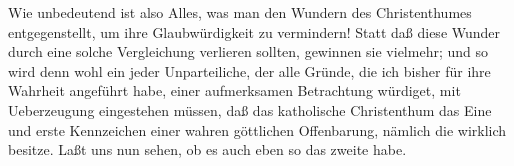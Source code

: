 Wie unbedeutend ist also Alles, was man den Wundern des Christenthumes entgegenstellt, um ihre Glaubwürdigkeit zu vermindern! Statt daß diese Wunder durch eine solche Vergleichung verlieren sollten, gewinnen sie vielmehr; und so wird denn wohl ein jeder Unparteiliche, der alle Gründe, die ich bisher für ihre Wahrheit angeführt habe, einer aufmerksamen Betrachtung würdiget, mit Ueberzeugung eingestehen müssen, daß das katholische Christenthum das Eine und erste Kennzeichen einer wahren göttlichen Offenbarung, nämlich die  wirklich besitze. Laßt uns nun sehen, ob es auch eben so das zweite habe.

\endinput
